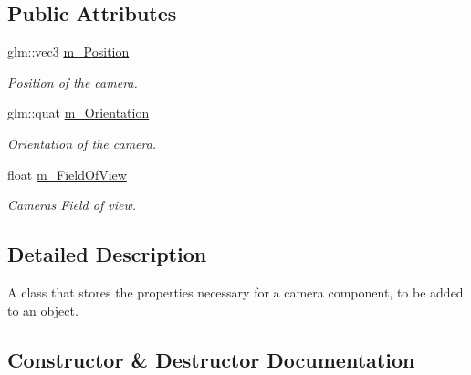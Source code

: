 \subsection*{Public Attributes}
\begin{DoxyCompactItemize}
\item 
\mbox{\label{class_camera_component_aced8f6cf0b7362d3c8c96698670147d5}} 
glm\+::vec3 \mbox{\hyperlink{class_camera_component_aced8f6cf0b7362d3c8c96698670147d5}{m\+\_\+\+Position}}
\begin{DoxyCompactList}\small\item\em Position of the camera. \end{DoxyCompactList}\item 
\mbox{\label{class_camera_component_ab46f86357ab7f0868702aac7908950df}} 
glm\+::quat \mbox{\hyperlink{class_camera_component_ab46f86357ab7f0868702aac7908950df}{m\+\_\+\+Orientation}}
\begin{DoxyCompactList}\small\item\em Orientation of the camera. \end{DoxyCompactList}\item 
\mbox{\label{class_camera_component_a02ed3df0f7538518548fbb1a9d646f8d}} 
float \mbox{\hyperlink{class_camera_component_a02ed3df0f7538518548fbb1a9d646f8d}{m\+\_\+\+Field\+Of\+View}}
\begin{DoxyCompactList}\small\item\em Camera\textquotesingle{}s Field of view. \end{DoxyCompactList}\end{DoxyCompactItemize}


\subsection{Detailed Description}
A class that stores the properties necessary for a camera component, to be added to an object. 

\subsection{Constructor \& Destructor Documentation}
\mbox{\label{class_camera_component_a0469c99fc7579c782574162032c3d7e3}} 
